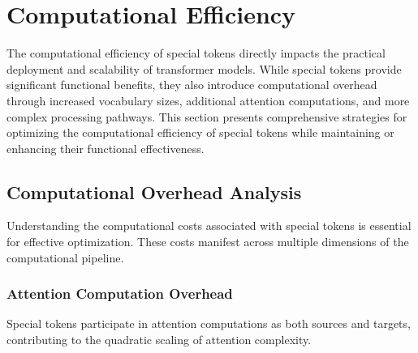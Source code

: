 
\section{Computational Efficiency}

The computational efficiency of special tokens directly impacts the practical deployment and scalability of transformer models. While special tokens provide significant functional benefits, they also introduce computational overhead through increased vocabulary sizes, additional attention computations, and more complex processing pathways. This section presents comprehensive strategies for optimizing the computational efficiency of special tokens while maintaining or enhancing their functional effectiveness.

\subsection{Computational Overhead Analysis}

Understanding the computational costs associated with special tokens is essential for effective optimization. These costs manifest across multiple dimensions of the computational pipeline.

\subsubsection{Attention Computation Overhead}

Special tokens participate in attention computations as both sources and targets, contributing to the quadratic scaling of attention complexity.

